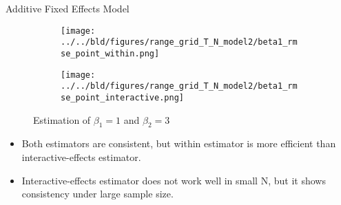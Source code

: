 \documentclass{beamer}
\begin{document}
\begin{frame}{Additive Fixed Effects Model}
    \begin{figure}
\begin{subfigure}{.5\textwidth}
\centering
\texttt{[image: ../../bld/figures/range\_grid\_T\_N\_model2/beta1\_rmse\_point\_within.png]}
\end{subfigure}%
\begin{subfigure}{.5\textwidth}
\centering
\texttt{[image: ../../bld/figures/range\_grid\_T\_N\_model2/beta1\_rmse\_point\_interactive.png]}
\end{subfigure}%
\centering
\caption{Estimation of $\beta_1=1$ and $\beta_2=3$}
\end{figure}

\begin{itemize}
\item Both estimators are consistent, but within estimator is more efficient than interactive-effects estimator.
\item Interactive-effects estimator does not work well in small N, but it shows consistency under large sample size.
\end{itemize}
\end{frame}
\end{document}
